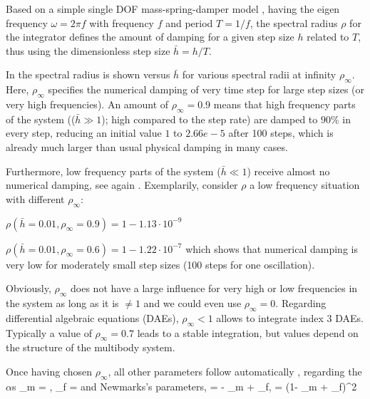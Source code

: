 Based on a simple single DOF mass-spring-damper model \cite{Bauchau2011}, having the eigen frequency $\omega = 2\pi f$ with frequency $f$ and period $T=1/f$, the spectral radius $\rho$ for the integrator defines the amount of damping for a given step size $h$ related to $T$, thus using the dimensionless step size $\bar h=h/T$.

In  the spectral radius is shown versus $\bar h$ for various spectral radii at infinity $\rho_\infty$. 
Here, $\rho_\infty$ specifies the numerical damping of very time step for large step sizes (or very high frequencies). An amount of $\rho_\infty=0.9$ means that high frequency parts of the system (($\bar h \gg 1$); high compared to the step rate) are damped to $90\%$ in every step, reducing an initial value $1$ to $2.66e-5$ after 100 steps, which is already much larger than usual physical damping in many cases.

Furthermore, low frequency parts of the system ($\bar h \ll 1$) receive almost no numerical damping, see again . 
Exemplarily, consider $\rho$ a low frequency situation with different $\rho_\infty$:
\bi
  \item $\rho(\bar h=0.01, \rho_\infty=0.9) = 1 - 1.13\cdot 10^{-9}$
  \item $\rho(\bar h=0.01, \rho_\infty=0.6) = 1 - 1.22\cdot 10^{-7}$
\ei
which shows that numerical damping is very low for moderately small step sizes (100 steps for one oscillation).

Obviously, $\rho_\infty$ does not have a large influence for very high or low frequencies in the system as long as it is $\neq 1$ and we could even use $\rho_\infty=0$.
Regarding differential algebraic equations (DAEs), $\rho_\infty<1$ allows to integrate index 3 DAEs. Typically a value of $\rho_\infty=0.7$ leads to a stable integration, but values depend on the structure of the multibody system.

Once having chosen $\rho_\infty$, all other parameters follow automatically \cite{Chung1993}, regarding the $\alpha$s
\be
  \alpha_m = , \quad
  \alpha_f = 
\ee
and Newmarks's parameters,
\be
  \gamma =  - \alpha_m + \alpha_f, \quad 
  \beta = (1- \alpha_m + \alpha_f)^2
\ee



